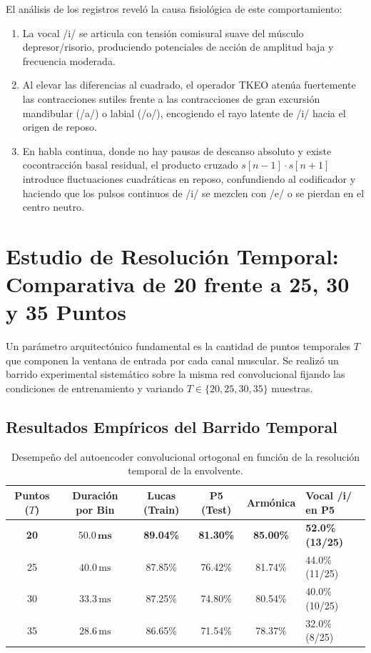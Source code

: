 \documentclass[11pt,a4paper]{article}
\begin{document}
El análisis de los registros reveló la causa fisiológica de este comportamiento:
\begin{enumerate}
    \item La vocal /i/ se articula con tensión comisural suave del músculo depresor/risorio, produciendo potenciales de acción de amplitud baja y frecuencia moderada.
    \item Al elevar las diferencias al cuadrado, el operador TKEO atenúa fuertemente las contracciones sutiles frente a las contracciones de gran excursión mandibular (/a/) o labial (/o/), encogiendo el rayo latente de /i/ hacia el origen de reposo.
    \item En habla continua, donde no hay pausas de descanso absoluto y existe cocontracción basal residual, el producto cruzado $s[n-1] \cdot s[n+1]$ introduce fluctuaciones cuadráticas en reposo, confundiendo al codificador y haciendo que los pulsos continuos de /i/ se mezclen con /e/ o se pierdan en el centro neutro.
\end{enumerate}

\section{Estudio de Resolución Temporal: Comparativa de 20 frente a 25, 30 y 35 Puntos}
\label{sec:estudio_resolucion_temporal}

Un parámetro arquitectónico fundamental es la cantidad de puntos temporales $T$ que componen la ventana de entrada por cada canal muscular. Se realizó un barrido experimental sistemático sobre la misma red convolucional fijando las condiciones de entrenamiento y variando $T \in \{20, 25, 30, 35\}$ muestras.

\subsection{Resultados Empíricos del Barrido Temporal}
\label{subsec:resultados_barrido_temporal}

\begin{table}[H]
\centering
\begin{tabularx}{\textwidth}{c c c c c X}
\toprule
\textbf{Puntos ($T$)} & \textbf{Duración por Bin} & \textbf{Lucas (Train)} & \textbf{P5 (Test)} & \textbf{Armónica} & \textbf{Vocal /i/ en P5} \\
\midrule
\textbf{20} & $\mathbf{50.0\,\text{ms}}$ & \textbf{89.04\%} & \textbf{81.30\%} & \textbf{85.00\%} & \textbf{52.0\% (13/25)} \\
25 & $40.0\,\text{ms}$ & 87.85\% & 76.42\% & 81.74\% & 44.0\% (11/25) \\
30 & $33.3\,\text{ms}$ & 87.25\% & 74.80\% & 80.54\% & 40.0\% (10/25) \\
35 & $28.6\,\text{ms}$ & 86.65\% & 71.54\% & 78.37\% & 32.0\% (8/25) \\
\bottomrule
\end{tabularx}
\caption{Desempeño del autoencoder convolucional ortogonal en función de la resolución temporal de la envolvente.}
\label{tab:resolucion_temporal}
\end{table}
\end{document}
